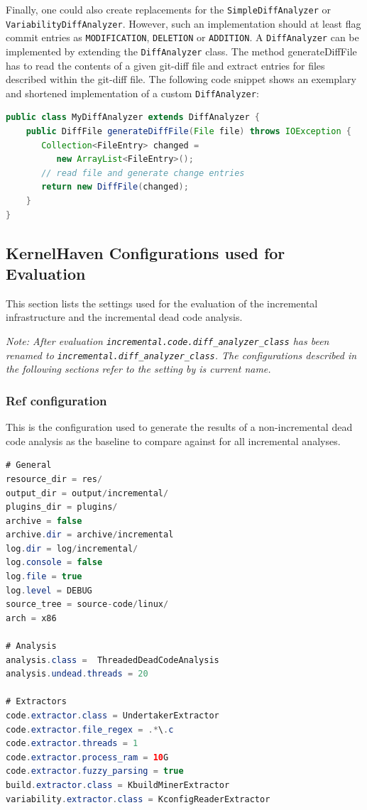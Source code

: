 \documentclass[a4paper]{article}
\begin{document}
Finally, one could also create replacements for the \texttt{SimpleDiffAnalyzer} or \texttt{VariabilityDiffAnalyzer}. However, such an implementation should at least flag commit entries as \texttt{MODIFICATION}, \texttt{DELETION} or \texttt{ADDITION}.
A \texttt{DiffAnalyzer} can be implemented by extending the \texttt{DiffAnalyzer} class. The method generateDiffFile has to read the contents of a given git-diff file and extract entries for files described within the git-diff file. The following code snippet shows an exemplary and shortened implementation of a custom \texttt{DiffAnalyzer}:

\begin{lstlisting}[language=java]
public class MyDiffAnalyzer extends DiffAnalyzer {
	public DiffFile generateDiffFile(File file) throws IOException {
	   Collection<FileEntry> changed = 
	      new ArrayList<FileEntry>();
	   // read file and generate change entries
	   return new DiffFile(changed);
	}
}
\end{lstlisting}



\subsection{KernelHaven Configurations used for Evaluation} \label{config-evaluation}
This section lists the settings used for the evaluation of the incremental infrastructure and the incremental dead code analysis.

\emph{Note: After evaluation \texttt{incremental.code.diff\_analyzer\_class} has been renamed to \texttt{incremental.diff\_analyzer\_class}. The configurations described in the following sections refer to the setting by is current name.}	


\subsubsection{Ref configuration}

This is the configuration used to generate the results of a non-incremental dead code analysis as the baseline to compare against for all incremental analyses.

\begin{lstlisting}[language=java]
# General
resource_dir = res/
output_dir = output/incremental/
plugins_dir = plugins/
archive = false
archive.dir = archive/incremental
log.dir = log/incremental/
log.console = false
log.file = true
log.level = DEBUG
source_tree = source-code/linux/
arch = x86

# Analysis  
analysis.class =  ThreadedDeadCodeAnalysis
analysis.undead.threads = 20

# Extractors  
code.extractor.class = UndertakerExtractor
code.extractor.file_regex = .*\.c
code.extractor.threads = 1
code.extractor.process_ram = 10G
code.extractor.fuzzy_parsing = true
build.extractor.class = KbuildMinerExtractor
variability.extractor.class = KconfigReaderExtractor
\end{lstlisting}
\end{document}
